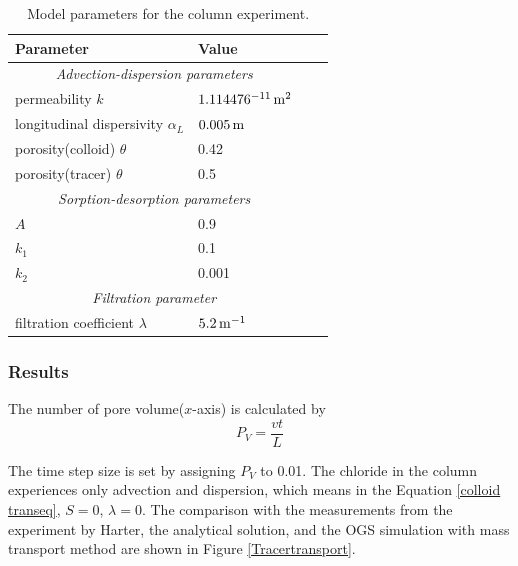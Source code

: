 \begin{table}[ht]
\begin{center}
\begin{tabular}{llll}
\toprule
Parameter 						& Value \\
\midrule
\multicolumn{2}{c}{\textit{Advection-dispersion parameters}} \\
permeability $k$				& $\unit[1.114476^{-11}]{m^2}$  \\
longitudinal dispersivity $\alpha_L$ 				& $\unit[0.005]{m}$  \\
porosity(colloid) $\theta$ 			& 0.42  \\
porosity(tracer) $\theta$ 			& 0.5  \\
\cmidrule{1-4}
\multicolumn{2}{c}{\textit{Sorption-desorption parameters}}\\
$A$            			& 0.9  \\ 
$k_{1}$ 		    		& 0.1 \\
$k_{2}$ 		    		& 0.001 \\
\cmidrule{1-4}
\multicolumn{2}{c}{\textit{Filtration parameter}}\\
filtration coefficient $\lambda$ 			& $\unit[5.2]{m^{-1}}$  \\
\bottomrule
\end{tabular}
\end{center}
\caption{\label{colloid transport parameters}Model parameters for the column experiment.}
\end{table}

\subsubsection*{Results}
%
The number of pore volume($x$-axis) is calculated by
\begin{equation}\label{colloid pv}
P_{V} = \frac{v t}{L}
\end{equation}

The time step size is set by assigning $P_{V}$ to 0.01. The chloride in the column experiences only advection and dispersion, which means in the Equation \ref{colloid transeq}, $S = 0$, $\lambda = 0$. The comparison with the measurements from the experiment by Harter, the analytical solution, and the OGS simulation with mass transport method are shown in Figure \ref{Tracertransport}.

